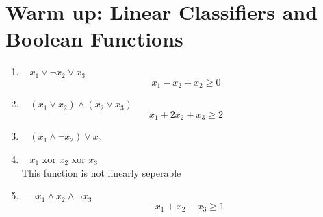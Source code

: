 \section{Warm up: Linear Classifiers and Boolean Functions}\label{sec:q1}

\begin{enumerate}
\item~ $x_1\vee\neg x_2\vee x_3$\\
$$ x_1 - x_2 + x_2 \geq 0 $$

\item~ $(x_1\vee x_2)\wedge (x_2\vee x_3)$\\
$$ x_1 + 2x_2 + x_3 \geq 2 $$

\item~ $(x_1\wedge\neg x_2)\vee x_3$\\


\item~ $x_1\text{ xor } x_2\text{ xor }x_3$\\
This function is not linearly seperable

\item~ $\neg x_1 \wedge x_2\wedge\neg x_3$\\
$$ -x_1 + x_2 - x_3 \geq 1 $$

\end{enumerate}
